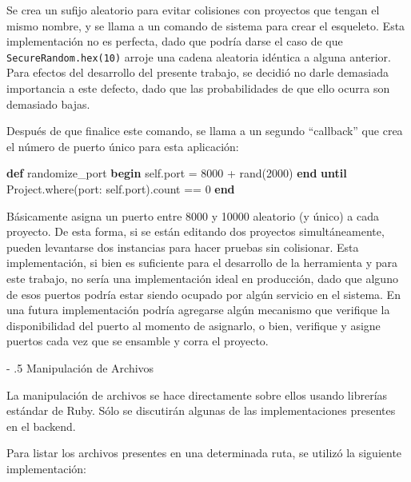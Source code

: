 \documentclass[12pt,titlepage,]{article}
\makeatletter
\newenvironment{Shaded}{}{}
\newcommand{\KeywordTok}[1]{\textcolor[rgb]{0.00,0.44,0.13}{\textbf{{#1}}}}
\newcommand{\DataTypeTok}[1]{\textcolor[rgb]{0.56,0.13,0.00}{{#1}}}
\newcommand{\DecValTok}[1]{\textcolor[rgb]{0.25,0.63,0.44}{{#1}}}
\newcommand{\NormalTok}[1]{{#1}}
\renewcommand\paragraph{%
   \@startsection{paragraph}{4}{0mm}%
      {-\baselineskip}%
      {.5\baselineskip}%
      {\normalfont\normalsize\bfseries}}
\makeatother
\begin{document}
Se crea un sufijo aleatorio para evitar colisiones con proyectos que
tengan el mismo nombre, y se llama a un comando de sistema para crear el
esqueleto. Esta implementación no es perfecta, dado que podría darse el
caso de que \texttt{SecureRandom.hex(10)} arroje una cadena aleatoria
idéntica a alguna anterior. Para efectos del desarrollo del presente
trabajo, se decidió no darle demasiada importancia a este defecto, dado
que las probabilidades de que ello ocurra son demasiado bajas.

Después de que finalice este comando, se llama a un segundo ``callback''
que crea el número de puerto único para esta aplicación:

\begin{Shaded}
\begin{Highlighting}[]
\KeywordTok{def} \NormalTok{randomize_port}
  \KeywordTok{begin}
    \DecValTok{self}\NormalTok{.port = }\DecValTok{8000} \NormalTok{+ rand(}\DecValTok{2000}\NormalTok{)}
  \KeywordTok{end} \KeywordTok{until} \DataTypeTok{Project}\NormalTok{.where(port: }\DecValTok{self}\NormalTok{.port).count == }\DecValTok{0}
\KeywordTok{end}
\end{Highlighting}
\end{Shaded}

Básicamente asigna un puerto entre 8000 y 10000 aleatorio (y único) a
cada proyecto. De esta forma, si se están editando dos proyectos
simultáneamente, pueden levantarse dos instancias para hacer pruebas sin
colisionar. Esta implementación, si bien es suficiente para el
desarrollo de la herramienta y para este trabajo, no sería una
implementación ideal en producción, dado que alguno de esos puertos
podría estar siendo ocupado por algún servicio en el sistema. En una
futura implementación podría agregarse algún mecanismo que verifique la
disponibilidad del puerto al momento de asignarlo, o bien, verifique y
asigne puertos cada vez que se ensamble y corra el proyecto.

\paragraph{Manipulación de Archivos}

La manipulación de archivos se hace directamente sobre ellos usando
librerías estándar de Ruby. Sólo se discutirán algunas de las
implementaciones presentes en el backend.

Para listar los archivos presentes en una determinada ruta, se utilizó
la siguiente implementación:
\end{document}
